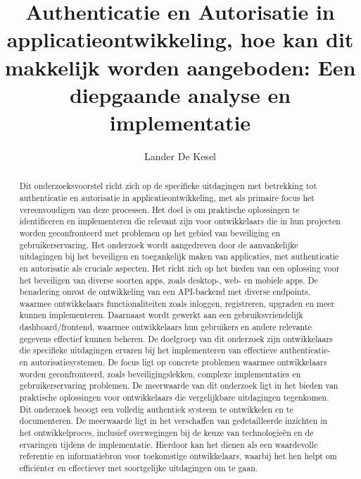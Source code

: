 \documentclass{hogent-article}
\title{Authenticatie en Autorisatie in applicatieontwikkeling, hoe kan dit makkelijk worden aangeboden: Een diepgaande analyse en implementatie}
\author{Lander De Kesel}
\begin{document}
\begin{abstract}
  Dit onderzoeksvoorstel richt zich op de specifieke uitdagingen met betrekking tot authenticatie en autorisatie in applicatieontwikkeling, met als primaire 
  focus het vereenvoudigen van deze processen. Het doel is om praktische oplossingen te identificeren en implementeren die relevant zijn voor ontwikkelaars 
  die in hun projecten worden geconfronteerd met problemen op het gebied van beveiliging en gebruikerservaring. 
  \newline
  \newline
  Het onderzoek wordt aangedreven door de aanvankelijke uitdagingen bij het beveiligen en toegankelijk maken van applicaties, met authenticatie en 
  autorisatie als cruciale aspecten. Het richt zich op het bieden van een oplossing voor het beveiligen van diverse soorten apps, zoals desktop-, 
  web- en mobiele apps. De benadering omvat de ontwikkeling van een API-backend met diverse endpoints, waarmee ontwikkelaars functionaliteiten zoals 
  inloggen, registreren, upgraden en meer kunnen implementeren. Daarnaast wordt gewerkt aan een gebruiksvriendelijk dashboard/frontend, waarmee 
  ontwikkelaars hun gebruikers en andere relevante gegevens effectief kunnen beheren. 
  \newline
  \newline
  De doelgroep van dit onderzoek zijn ontwikkelaars die specifieke uitdagingen ervaren bij het implementeren van effectieve authenticatie- en 
  autorisatiesystemen. De focus ligt op concrete problemen waarmee ontwikkelaars worden geconfronteerd, zoals beveiligingslekken, complexe implementaties 
  en gebruikerservaring problemen. 
  \newline
  \newline
  De meerwaarde van dit onderzoek ligt in het bieden van praktische oplossingen voor ontwikkelaars die vergelijkbare uitdagingen tegenkomen. 
  Dit onderzoek beoogt een volledig authentiek systeem te ontwikkelen en te documenteren. De meerwaarde ligt in het verschaffen van gedetailleerde 
  inzichten in het ontwikkelproces, inclusief overwegingen bij de keuze van technologieën en de ervaringen tijdens de implementatie. Hierdoor kan het 
  dienen als een waardevolle referentie en informatiebron voor toekomstige ontwikkelaars, waarbij het hen helpt om efficiënter en effectiever met 
  soortgelijke uitdagingen om te gaan.
\end{abstract}

\tableofcontents



\printbibliography[heading=bibintoc]
\end{document}

